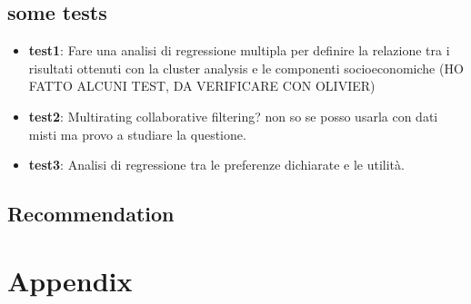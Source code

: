 \documentclass[a4paper]{article}
\begin{document}
\subsection{some tests}

\begin{itemize}
    \item\textbf{test1}: Fare una analisi di regressione multipla per definire la relazione tra i risultati ottenuti con la cluster analysis e le componenti socioeconomiche (HO FATTO ALCUNI TEST, DA VERIFICARE CON OLIVIER)
     \item\textbf{test2}:  Multirating collaborative filtering? non so se posso usarla con dati misti ma provo a studiare la questione.
     \item\textbf{test3}: Analisi di regressione tra le preferenze dichiarate e le utilità.

    \end{itemize}

\subsection{Recommendation}








\section{Appendix}
\end{document}
